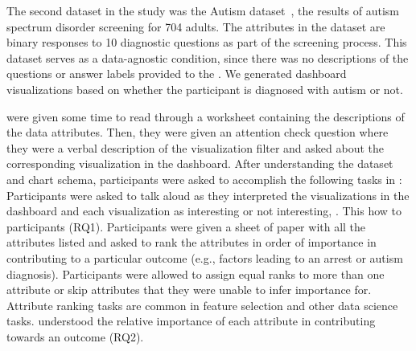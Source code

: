 The second dataset in the study 
was the Autism dataset~\cite{autism}, 
 the results of autism spectrum 
disorder screening for 704 adults. 
The attributes in the dataset are binary responses 
to 10 diagnostic questions 
as part of the screening process. 
This dataset serves as a data-agnostic condition, 
since there was no descriptions 
of the questions or answer labels provided to the 
. 
We generated dashboard visualizations 
based on whether the participant is diagnosed with autism or not.

were given some time to read through a worksheet 
containing the descriptions of the data attributes. 
Then, they were given an attention check question 
where they were 
a verbal description of the visualization filter 
and asked about the corresponding visualization in the dashboard. 
After understanding the dataset and chart schema, 
participants were asked to accomplish the following 
tasks in :
Participants were asked to talk aloud 
as they interpreted the visualizations 
in the dashboard and  
each visualization as interesting or 
not interesting, . 
This  
how  
to participants (RQ1).%
Participants were given a sheet of paper 
with all the attributes listed 
and asked to rank the attributes 
in order of importance in contributing 
to a particular outcome (e.g., factors leading to an arrest or autism diagnosis). Participants were allowed to assign equal ranks to more than one attribute or skip attributes that they were unable to infer importance for. 
Attribute ranking tasks are common in feature selection and other data science tasks.
understood the relative importance of each attribute in contributing towards an outcome (RQ2).
